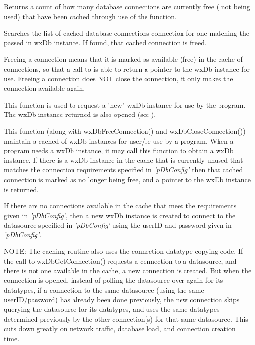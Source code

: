

Returns a count of how many database connections are currently free ( not
being used) that have been cached through use of the 
function.




Searches the list of cached database connections connection for one matching
the passed in wxDb instance.  If found, that cached connection is freed.

Freeing a connection means that it is marked as available (free) in the
cache of connections, so that a call to 
is able to return a pointer to the wxDb instance for use.  Freeing a
connection does NOT close the connection, it only makes the connection
available again.




This function is used to request a "new" wxDb instance for use by the program.
The wxDb instance returned is also opened (see ).

This function (along with wxDbFreeConnection() and wxDbCloseConnection())
maintain a cached of wxDb instances for user/re-use by a program.  When a
program needs a wxDb instance, it may call this function to obtain a wxDb
instance.  If there is a wxDb instance in the cache that is currently unused
that matches the connection requirements specified in {\it'pDbConfig'} then
that cached connection is marked as no longer being free, and a pointer to
the wxDb instance is returned.

If there are no connections available in the cache that meet the requirements
given in {\it'pDbConfig'}, then a new wxDb instance is created to connect
to the datasource specified in {\it'pDbConfig'} using the userID and password
given in {\it'pDbConfig'}.

NOTE: The caching routine also uses the 
connection datatype copying code.  If the call to wxDbGetConnection()
requests a connection to a datasource, and there is not one available in the
cache, a new connection is created.  But when the connection is opened,
instead of polling the datasource over again for its datatypes, if a
connection to the same datasource (using the same userID/password) has already
been done previously, the new connection skips querying the datasource for
its datatypes, and uses the same datatypes determined previously by the
other connection(s) for that same datasource.  This cuts down greatly on
network traffic, database load, and connection creation time.

